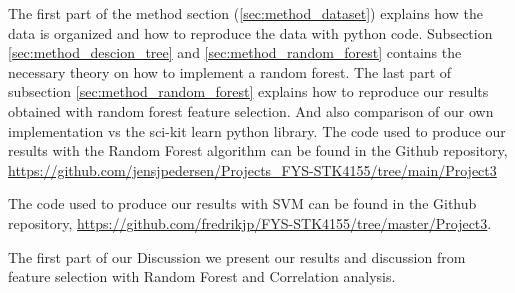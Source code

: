 The first part of the method section (\ref{sec:method_dataset}) explains how the data is organized and
how to reproduce the data with python code. Subsection
\ref{sec:method_descion_tree} and \ref{sec:method_random_forest} contains the
necessary theory on how to implement a random forest. The last part of
subsection \ref{sec:method_random_forest} explains how to reproduce our results
obtained with random forest feature selection. And also comparison of our own
implementation vs the sci-kit learn python library. The code used to produce
our results with the Random Forest algorithm can be found in the Github repository,
\url{https://github.com/jensjpedersen/Projects_FYS-STK4155/tree/main/Project3} 


The code used to produce our results with SVM can be found in the Github repository,
\url{https://github.com/fredrikjp/FYS-STK4155/tree/master/Project3}. 



The first part of our Discussion we present our results and discussion from
feature selection with Random Forest and Correlation analysis.  






